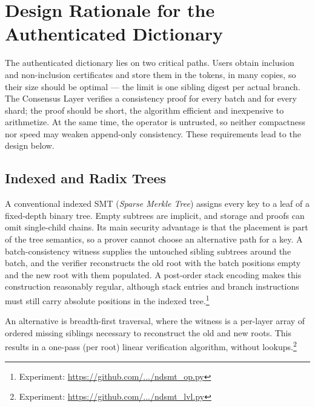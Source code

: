 \documentclass[11pt]{article}
\begin{document}
\section{Design Rationale for the Authenticated Dictionary}
\label{sec:tree-design}

The authenticated dictionary lies on two critical paths. Users obtain inclusion and non-inclusion certificates and store them in the tokens, in many copies, so their size should be optimal --- the limit is one sibling digest per actual branch. The Consensus Layer verifies a consistency proof for every batch and for every shard; the proof should be short, the algorithm efficient and inexpensive to arithmetize. At the same time, the operator is untrusted, so neither compactness nor speed may weaken append-only consistency. These requirements lead to the design below.

\subsection{Indexed and Radix Trees}

A conventional indexed SMT (\emph{Sparse Merkle Tree}) assigns every key to a leaf of a fixed-depth binary tree. Empty subtrees are implicit, and storage and proofs can omit single-child chains. Its main security advantage is that the placement is part of the tree semantics, so a prover cannot choose an alternative path for a key. A batch-consistency witness supplies the untouched sibling subtrees around the batch, and the verifier reconstructs the old root with the batch positions empty and the new root with them populated. A post-order stack encoding makes this construction reasonably regular, although stack entries and branch instructions must still carry absolute positions in the indexed tree.\footnote{Experiment: \href{https://github.com/ristik/ndsmt-experiments/blob/main/ndsmt_op.py}{https://github.com/.../ndsmt\_op.py}}

An alternative is breadth-first traversal, where the witness is a per-layer array of ordered missing siblings necessary to reconstruct the old and new roots. This results in a one-pass (per root) linear verification algorithm, without lookups.\footnote{Experiment: \href{https://github.com/ristik/ndsmt-experiments/blob/main/ndsmt_lvl.py}{https://github.com/.../ndsmt\_lvl.py}}
\end{document}
